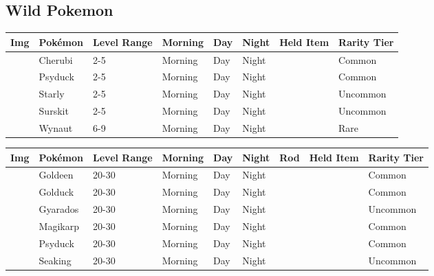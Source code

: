 \subsection{Wild Pokemon}%
\label{subsec:WildPokemon}%
\begin{longtable}{||l l l l l l l l||}%
\hline%
Img&Pokémon&Level Range&Morning&Day&Night&Held Item&Rarity Tier\\%
\hline%
\endhead%
\hline%
&Cherubi&2{-}5&Morning&Day&Night&&Common\\%
\hline%
&Psyduck&2{-}5&Morning&Day&Night&&Common\\%
\hline%
&Starly&2{-}5&Morning&Day&Night&&Uncommon\\%
\hline%
&Surskit&2{-}5&Morning&Day&Night&&Uncommon\\%
\hline%
&Wynaut&6{-}9&Morning&Day&Night&&Rare\\%
\hline%
\end{longtable}%
\begin{longtable}{||l l l l l l l l l||}%
\hline%
Img&Pokémon&Level Range&Morning&Day&Night&Rod&Held Item&Rarity Tier\\%
\hline%
\endhead%
\hline%
&Goldeen&20{-}30&Morning&Day&Night&&&Common\\%
\hline%
&Golduck&20{-}30&Morning&Day&Night&&&Common\\%
\hline%
&Gyarados&20{-}30&Morning&Day&Night&&&Uncommon\\%
\hline%
&Magikarp&20{-}30&Morning&Day&Night&&&Common\\%
\hline%
&Psyduck&20{-}30&Morning&Day&Night&&&Common\\%
\hline%
&Seaking&20{-}30&Morning&Day&Night&&&Uncommon\\%
\hline%
\end{longtable}